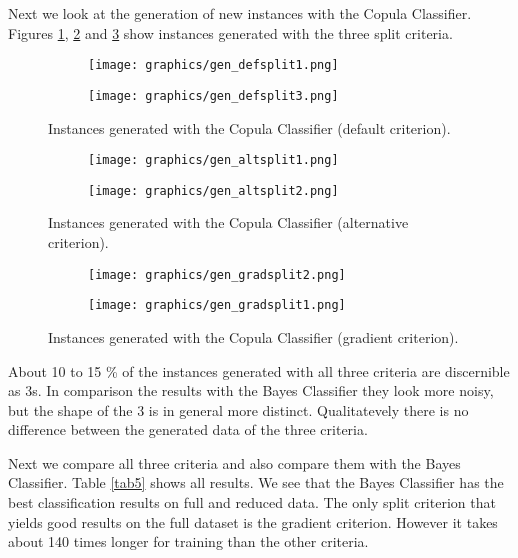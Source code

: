 \documentclass{article}
\begin{document}
Next we look at the generation of new instances with the Copula Classifier.
Figures \ref{fig3}, \ref{fig4} and \ref{fig5} show instances generated with the three
split criteria.

\begin{figure}[h]
	\centering
	\begin{subfigure}[b]{0.4\textwidth}
		\texttt{[image: graphics/gen\_defsplit1.png]}
	\end{subfigure}
	\begin{subfigure}[b]{0.4\textwidth}
		\texttt{[image: graphics/gen\_defsplit3.png]}
	\end{subfigure}
	\caption{Instances generated with the Copula Classifier (default criterion).}
	\label{fig3}
\end{figure}

\begin{figure}[h]
	\centering
	\begin{subfigure}[b]{0.4\textwidth}
		\texttt{[image: graphics/gen\_altsplit1.png]}
	\end{subfigure}
	\begin{subfigure}[b]{0.4\textwidth}
		\texttt{[image: graphics/gen\_altsplit2.png]}
	\end{subfigure}
	\caption{Instances generated with the Copula Classifier (alternative criterion).}
	\label{fig4}
\end{figure}

\begin{figure}[h]
	\centering
	\begin{subfigure}[b]{0.4\textwidth}
		\texttt{[image: graphics/gen\_gradsplit2.png]}
	\end{subfigure}
	\begin{subfigure}[b]{0.4\textwidth}
		\texttt{[image: graphics/gen\_gradsplit1.png]}
	\end{subfigure}
	\caption{Instances generated with the Copula Classifier (gradient criterion).}
	\label{fig5}
\end{figure}

\FloatBarrier

About 10 to 15 \% of the instances generated with all three criteria are discernible as 3s.
In comparison the results with the Bayes Classifier they look more noisy, but the shape of the 3 is 
in general more distinct. Qualitatevely there is no difference between the generated data of the three criteria.

Next we compare all three criteria and also compare them with the Bayes Classifier.
Table \ref{tab5} shows all results. We see that the Bayes Classifier has the best classification
results on full and reduced data. The only split criterion that yields good results on the full dataset is
the gradient criterion. However it takes about 140 times longer for training than the other criteria.
\end{document}
